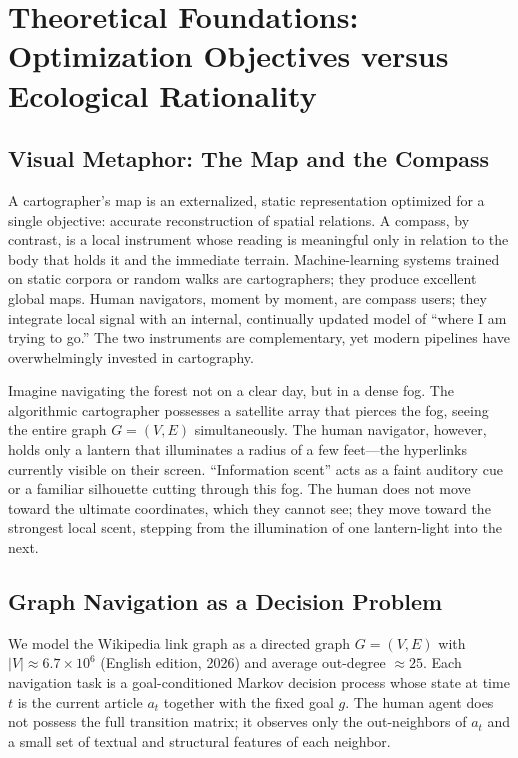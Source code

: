 \documentclass[11pt,a4paper]{report}
\begin{document}
\chapter{Theoretical Foundations: Optimization Objectives versus Ecological Rationality}

\section{Visual Metaphor: The Map and the Compass}

A cartographer’s map is an externalized, static representation optimized for a single objective: accurate reconstruction of spatial relations. A compass, by contrast, is a local instrument whose reading is meaningful only in relation to the body that holds it and the immediate terrain. Machine-learning systems trained on static corpora or random walks are cartographers; they produce excellent global maps. Human navigators, moment by moment, are compass users; they integrate local signal with an internal, continually updated model of “where I am trying to go.” The two instruments are complementary, yet modern pipelines have overwhelmingly invested in cartography.

Imagine navigating the forest not on a clear day, but in a dense fog. The algorithmic cartographer possesses a satellite array that pierces the fog, seeing the entire graph \(G=(V,E)\) simultaneously. The human navigator, however, holds only a lantern that illuminates a radius of a few feet—the hyperlinks currently visible on their screen. ``Information scent'' acts as a faint auditory cue or a familiar silhouette cutting through this fog. The human does not move toward the ultimate coordinates, which they cannot see; they move toward the strongest local scent, stepping from the illumination of one lantern-light into the next.

\section{Graph Navigation as a Decision Problem}

We model the Wikipedia link graph as a directed graph \(G = (V, E)\) with \(|V| \approx 6.7 \times 10^6\) (English edition, 2026) and average out-degree \(\approx 25\). Each navigation task is a goal-conditioned Markov decision process whose state at time \(t\) is the current article \(a_t\) together with the fixed goal \(g\). The human agent does not possess the full transition matrix; it observes only the out-neighbors of \(a_t\) and a small set of textual and structural features of each neighbor.
\end{document}
